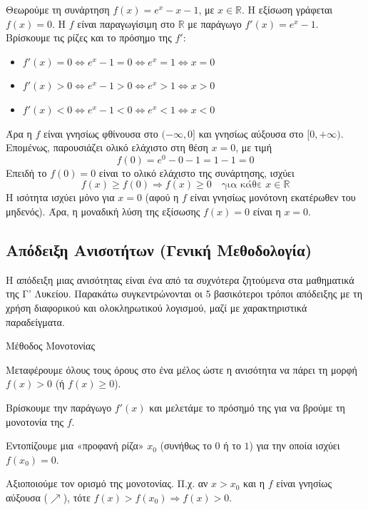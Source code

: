 
\lysh
Θεωρούμε τη συνάρτηση $f(x) = e^x - x - 1$, με $x \in \mathbb{R}$.
Η εξίσωση γράφεται $f(x) = 0$.
Η $f$ είναι παραγωγίσιμη στο $\mathbb{R}$ με παράγωγο $f'(x) = e^x - 1$.
Βρίσκουμε τις ρίζες και το πρόσημο της $f'$:
\begin{itemize}
    \item $f'(x) = 0 \Leftrightarrow e^x - 1 = 0 \Leftrightarrow e^x = 1 \Leftrightarrow x = 0$
    \item $f'(x) > 0 \Leftrightarrow e^x - 1 > 0 \Leftrightarrow e^x > 1 \Leftrightarrow x > 0$
    \item $f'(x) < 0 \Leftrightarrow e^x - 1 < 0 \Leftrightarrow e^x < 1 \Leftrightarrow x < 0$
\end{itemize}
Άρα η $f$ είναι γνησίως φθίνουσα στο $(-\infty, 0]$ και γνησίως αύξουσα στο $[0, +\infty)$. 
Επομένως, παρουσιάζει ολικό ελάχιστο στη θέση $x=0$, με τιμή 
\[ f(0) = e^0 - 0 - 1 = 1 - 1 = 0 \]
Επειδή το $f(0) = 0$ είναι το ολικό ελάχιστο της συνάρτησης, ισχύει 
\[ f(x) \ge f(0) \Rightarrow f(x) \ge 0 \quad \text{για κάθε } x \in \mathbb{R} \]
Η ισότητα ισχύει μόνο για $x = 0$ (αφού η $f$ είναι γνησίως μονότονη εκατέρωθεν του μηδενός). 
Άρα, η μοναδική λύση της εξίσωσης $f(x) = 0$ είναι η $x = 0$.

\subsection{Απόδειξη Ανισοτήτων (Γενική Μεθοδολογία)}
Η απόδειξη μιας ανισότητας είναι ένα από τα συχνότερα ζητούμενα στα μαθηματικά της Γ' Λυκείου. Παρακάτω συγκεντρώνονται οι $5$ βασικότεροι τρόποι απόδειξης με τη χρήση διαφορικού και ολοκληρωτικού λογισμού, μαζί με χαρακτηριστικά παραδείγματα.

\begin{askhsh}{Μέθοδος Μονοτονίας}
\bhmata\begin{bhma}
\item Μεταφέρουμε όλους τους όρους στο ένα μέλος ώστε η ανισότητα να πάρει τη μορφή $f(x) > 0$ (ή $f(x) \ge 0$).
\item Βρίσκουμε την παράγωγο $f'(x)$ και μελετάμε το πρόσημό της για να βρούμε τη μονοτονία της $f$.
\item Εντοπίζουμε μια «προφανή ρίζα» $x_0$ (συνήθως το $0$ ή το $1$) για την οποία ισχύει $f(x_0)=0$.
\item Αξιοποιούμε τον ορισμό της μονοτονίας. Π.χ. αν $x > x_0$ και η $f$ είναι γνησίως αύξουσα ($\nearrow$), τότε $f(x) > f(x_0) \Rightarrow f(x) > 0$.
\end{bhma}
\end{askhsh}

